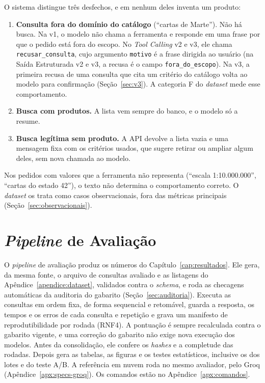 O sistema distingue três desfechos, e em nenhum deles inventa um produto:
\begin{enumerate}
  \item \textbf{Consulta fora do domínio do catálogo} (``cartas de Marte''). Não há busca. Na v1, o modelo não chama a ferramenta e responde em uma frase por que o pedido está fora do escopo. No \textit{Tool Calling} v2 e v3, ele chama \texttt{recusar\_consulta}, cujo argumento \texttt{motivo} é a frase dirigida ao usuário (na Saída Estruturada v2 e v3, a recusa é o campo \texttt{fora\_do\_escopo}). Na v3, a primeira recusa de uma consulta que cita um critério do catálogo volta ao modelo para confirmação (Seção~\ref{sec:v3}). A categoria F do \textit{dataset} mede esse comportamento.
  \item \textbf{Busca com produtos.} A lista vem sempre do banco, e o modelo só a resume.
  \item \textbf{Busca legítima sem produto.} A API devolve a lista vazia e uma mensagem fixa com os critérios usados, que sugere retirar ou ampliar algum deles, sem nova chamada ao modelo.
\end{enumerate}

Nos pedidos com valores que a ferramenta não representa (``escala 1:10.000.000'', ``cartas do estado 42''), o texto não determina o comportamento correto. O \textit{dataset} os trata como casos observacionais, fora das métricas principais (Seção~\ref{sec:observacionais}).

\section{\textit{Pipeline} de Avaliação}
\label{sec:pipeline-avaliacao}

O \textit{pipeline} de avaliação produz os números do Capítulo~\ref{cap:resultados}. Ele gera, da mesma fonte, o arquivo de consultas avaliado e as listagens do Apêndice~\ref{apendice:dataset}, validados contra o \textit{schema}, e roda as checagens automáticas da auditoria do gabarito (Seção~\ref{sec:auditoria}). Executa as consultas em ordem fixa, de forma sequencial e retomável, guarda a resposta, os tempos e os erros de cada consulta e repetição e grava um manifesto de reprodutibilidade por rodada (RNF4). A pontuação é sempre recalculada contra o gabarito vigente, e uma correção do gabarito não exige nova execução dos modelos. Antes da consolidação, ele confere os \textit{hashes} e a completude das rodadas. Depois gera as tabelas, as figuras e os testes estatísticos, inclusive os dos lotes e do teste A/B. A referência em nuvem roda no mesmo avaliador, pelo Groq (Apêndice~\ref{apx:specs-groq}). Os comandos estão no Apêndice~\ref{apx:comandos}.

